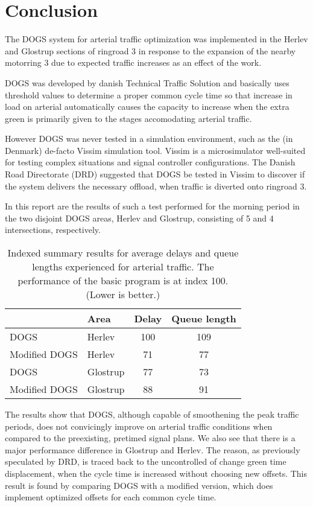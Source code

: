 \section{Conclusion}
\label{conclusion}

The DOGS system for arterial traffic optimization was implemented in the Herlev and Glostrup sections of ringroad 3 in response to the expansion of the nearby motorring 3 due to expected traffic increases as an effect of the work.

DOGS was developed by danish Technical Traffic Solution and basically uses threshold values to determine a proper common cycle time so that increase in load on arterial automatically causes the capacity to increase when the extra green is primarily given to the stages accomodating arterial traffic.

However DOGS was never tested in a simulation environment, such as the (in Denmark) de-facto Vissim simulation tool. Vissim is a microsimulator well-suited for testing complex situations and signal controller configurations.
The Danish Road Directorate (DRD) suggested that DOGS be tested in Vissim to discover if the system delivers the necessary offload, when traffic is diverted onto ringroad 3.

In this report are the results of such a test performed for the morning period in the two disjoint DOGS areas, Herlev and Glostrup, consisting of 5 and 4 intersections, respectively. 

\begin{table}[ht]
\centering
\begin{tabular}{l|l|c|c}
& \textbf{Area} & \textbf{Delay} & \textbf{Queue length} \\ \hline
DOGS & Herlev & 100 & 109 \\
Modified DOGS & Herlev & 71 & 77 \\
DOGS & Glostrup & 77 &  73 \\
Modified DOGS & Glostrup & 88 & 91
\end{tabular}
\caption{Indexed summary results for average delays and queue lengths experienced for arterial traffic. The performance of the basic program is at index 100. (Lower is better.)}
\label{tab:result_summary}
\end{table}

The results show that DOGS, although capable of smoothening the peak traffic periods, does not convicingly improve on arterial traffic conditions when compared to the preexisting, pretimed signal plans. We also see that there is a major performance difference in Glostrup and Herlev.
The reason, as previously speculated by DRD, is traced back to the uncontrolled of change green time displacement, when the cycle time is increased without choosing new offsets. This result is found by comparing DOGS with a modified version, which does implement optimized offsets for each common cycle time.

